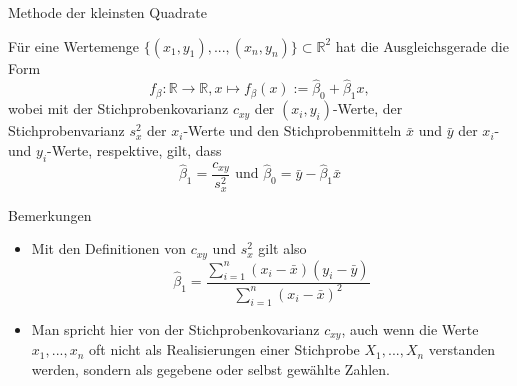 \documentclass[
  8pt,
  ignorenonframetext,
]{beamer}
\providecommand{\tightlist}{%
  \setlength{\itemsep}{0pt}\setlength{\parskip}{0pt}}
\begin{document}
\begin{frame}{Methode der kleinsten Quadrate}
\protect\hypertarget{methode-der-kleinsten-quadrate-6}{}
\footnotesize
\begin{theorem}[Ausgleichsgerade]
\justifying
\normalfont
Für eine Wertemenge $\{(x_1,y_1),...,(x_n,y_n)\}\subset\mathbb{R}^2$ hat die Ausgleichsgerade die Form
\begin{equation}
f_\beta : \mathbb{R} \to \mathbb{R}, x \mapsto f_\beta(x) := \hat{\beta}_0 + \hat{\beta}_1 x,
\end{equation}
wobei mit der Stichprobenkovarianz $c_{xy}$ der $(x_i,y_i)$-Werte, der
Stichprobenvarianz $s_x^2$ der $x_i$-Werte und den Stichprobenmitteln $\bar{x}$
und $\bar{y}$ der $x_i$- und $y_i$-Werte, respektive, gilt, dass
\begin{equation}
\hat{\beta}_1 = \frac{c_{xy}}{s_x^2} \mbox{ und } \hat{\beta}_0 = \bar{y} - \hat{\beta}_1\bar{x}
\end{equation}
\end{theorem}

Bemerkungen

\begin{itemize}
\tightlist
\item
  Mit den Definitionen von \(c_{xy}\) und \(s_x^2\) gilt also
  \begin{equation}
  \hat{\beta}_1 = \frac{\sum_{i=1}^n (x_i - \bar{x})(y_i - \bar{y})}{\sum_{i=1}^n (x_i - \bar{x})^2}
  \end{equation}
\item
  Man spricht hier von der Stichprobenkovarianz \(c_{xy}\), auch wenn
  die Werte \(x_1,...,x_n\) oft nicht als Realisierungen einer
  Stichprobe \(X_1,...,X_n\) verstanden werden, sondern als gegebene
  oder selbst gewählte Zahlen.
\end{itemize}
\end{frame}
\end{document}
